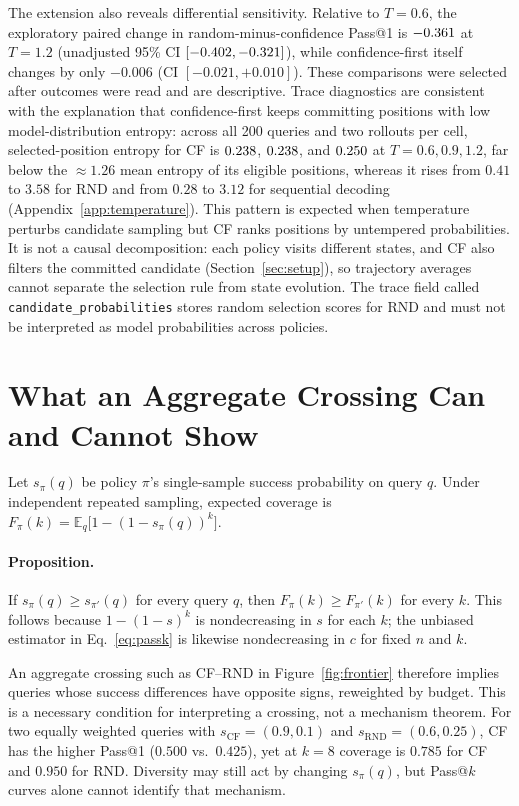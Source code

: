 \documentclass[11pt]{article}
\begin{document}
The extension also reveals differential sensitivity. Relative to $T=0.6$, the exploratory paired change in random-minus-confidence Pass@1 is $-0.361$ at $T=1.2$ (unadjusted 95\% CI $[-0.402,-0.321]$), while confidence-first itself changes by only $-0.006$ (CI $[-0.021,+0.010]$). These comparisons were selected after outcomes were read and are descriptive. Trace diagnostics are consistent with the explanation that confidence-first keeps committing positions with low model-distribution entropy: across all 200 queries and two rollouts per cell, selected-position entropy for CF is $0.238$, $0.238$, and $0.250$ at $T=0.6,0.9,1.2$, far below the ${\approx}1.26$ mean entropy of its eligible positions, whereas it rises from $0.41$ to $3.58$ for RND and from $0.28$ to $3.12$ for sequential decoding (Appendix~\ref{app:temperature}). This pattern is expected when temperature perturbs candidate sampling but CF ranks positions by untempered probabilities. It is not a causal decomposition: each policy visits different states, and CF also filters the committed candidate (Section~\ref{sec:setup}), so trajectory averages cannot separate the selection rule from state evolution. The trace field called \texttt{candidate\_probabilities} stores random selection scores for RND and must not be interpreted as model probabilities across policies.

\section{What an Aggregate Crossing Can and Cannot Show}
\label{sec:estimand}

Let $s_\pi(q)$ be policy $\pi$'s single-sample success probability on query $q$. Under independent repeated sampling, expected coverage is $F_\pi(k)=\mathbb{E}_q\bigl[1-(1-s_\pi(q))^k\bigr]$.

\paragraph{Proposition.} If $s_\pi(q)\geq s_{\pi'}(q)$ for every query $q$, then $F_\pi(k)\geq F_{\pi'}(k)$ for every $k$. This follows because $1-(1-s)^k$ is nondecreasing in $s$ for each $k$; the unbiased estimator in Eq.~\eqref{eq:passk} is likewise nondecreasing in $c$ for fixed $n$ and $k$.

An aggregate crossing such as CF--RND in Figure~\ref{fig:frontier} therefore implies queries whose success differences have opposite signs, reweighted by budget. This is a necessary condition for interpreting a crossing, not a mechanism theorem. For two equally weighted queries with $s_{\mathrm{CF}}=(0.9,0.1)$ and $s_{\mathrm{RND}}=(0.6,0.25)$, CF has the higher Pass@1 ($0.500$ vs.\ $0.425$), yet at $k=8$ coverage is $0.785$ for CF and $0.950$ for RND. Diversity may still act by changing $s_\pi(q)$, but Pass@$k$ curves alone cannot identify that mechanism.
\end{document}
